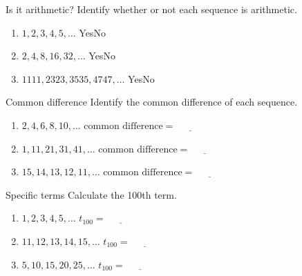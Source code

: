 \documentclass[12pt,letterpaper]{article}
\begin{document}
\begin{problem}{Is it arithmetic?}
 Identify whether or not each sequence is arithmetic.

 \begin{enumerate}[\hspace{.5cm}a.]
  \item $1, 2, 3, 4, 5, \ldots$ \hfill Yes\hspace{3em}No
  \item $2, 4, 8, 16, 32, \ldots$ \hfill Yes\hspace{3em}No
  \item $1111, 2323, 3535, 4747, \ldots$ \hfill Yes\hspace{3em}No
 \end{enumerate}
\end{problem}

\begin{problem}{Common difference}
 Identify the common difference of each sequence.

 \begin{enumerate}[\hspace{.5cm}a.]
  \item $2, 4, 6, 8, 10, \ldots$ \hfill $\text{common difference} =
  \underline{\hspace{3em}}$
  \item $1, 11, 21, 31, 41, \ldots$ \hfill
  $\text{common difference} = \underline{\hspace{3em}}$
  \item $15, 14, 13, 12,
  11, \ldots$ \hfill $\text{common difference} = \underline{\hspace{3em}}$
 \end{enumerate}
\end{problem}

\begin{problem}{Specific terms}
 Calculate the 100th term.

 \begin{enumerate}[\hspace{.5cm}a.]
  \item $1, 2, 3, 4, 5, \ldots$ \hfill $t_{100} = \underline{\hspace{3em}}$
  \item $11, 12, 13, 14, 15, \ldots$ \hfill $t_{100} = \underline{\hspace{3em}}$
  \item $5, 10, 15, 20, 25, \ldots$ \hfill $t_{100} = \underline{\hspace{3em}}$
 \end{enumerate}
\end{problem}
\end{document}
